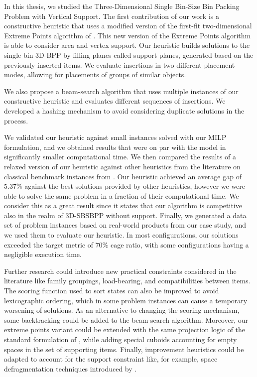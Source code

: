 In this thesis, we studied the Three-Dimensional Single Bin-Size Bin Packing Problem with Vertical Support.
The first contribution of our work is a constructive heuristic that uses a modified version of the first-fit two-dimensional Extreme Points algorithm of \citet{crainic2008extreme}. This new version of the Extreme Points algorithm is able to consider area and vertex support.
Our heuristic builds solutions to the single bin 3D-BPP by filling planes called support planes, generated based on the previously inserted items.
We evaluate insertions in two different placement modes, allowing for placements of groups of similar objects.

We also propose a beam-search algorithm that uses multiple instances of our constructive heuristic and evaluates different sequences of insertions. We developed a hashing mechanism to avoid considering duplicate solutions in the process.

We validated our heuristic against small instances solved with our MILP formulation, and we obtained results that were on par with the model in significantly smaller computational time.
We then compared the results of a relaxed version of our heuristic against other heuristics from the literature on classical benchmark instances from \citet{martello2000three}.
Our heuristic achieved an average gap of $5.37\%$ against the best solutions provided by other heuristics, however we were able to solve the same problem in a fraction of their computational time. We consider this as a great result since it states that our algorithm is competitive also in the realm of 3D-SBSBPP without support.
Finally, we generated a data set of problem instances based on real-world products from our case study, and we used them to evaluate our heuristic. In most configurations, our solutions exceeded the target metric of $70\%$ cage ratio, with some configurations having a negligible execution time.

Further research could introduce new practical constraints considered in the literature like family groupings, load-bearing, and compatibilities between items.
The scoring function used to sort states can also be improved to avoid lexicographic ordering, which in some problem instances can cause a temporary worsening of solutions.
As an alternative to changing the scoring mechanism, some backtracking could be added to the beam-search algorithm.
Moreover, our extreme points variant could be extended with the same projection logic of the standard formulation of \citet{crainic2008extreme}, while adding special cuboids accounting for empty spaces in the set of supporting items.
Finally, improvement heuristics could be adapted to account for the support constraint like, for example, space defragmentation techniques introduced by \cite{ZHU2012452}.